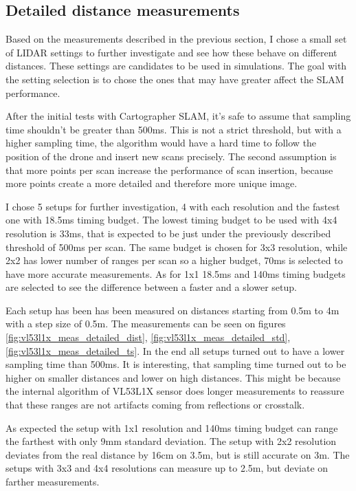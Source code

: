 \subsection{Detailed distance measurements} \label{sect:vl53l1x_detailed_measurements}
Based on the measurements described in the previous section, I chose a small set of LIDAR settings 
to further investigate and see how these behave on different distances. These settings are 
candidates to be used in simulations. The goal with the setting selection is to chose the ones
that may have greater affect the SLAM performance.

After the initial tests with Cartographer SLAM, it's safe to assume that sampling time shouldn't be
greater than 500ms. This is not a strict threshold, but with a higher sampling time, the algorithm 
would have a hard time to follow the position of the drone and insert new scans precisely. The second
assumption is that more points per scan increase the performance of scan insertion, because more points
create a more detailed and therefore more unique image. 

I chose 5 setups for further investigation, 4 with each resolution and the fastest one with 18.5ms 
timing budget. The lowest timing budget to be used with 4x4 resolution is 33ms, that is expected to be
just under the previously described threshold of 500ms per scan. The same budget is chosen for 3x3 
resolution, while 2x2 has lower number of ranges per scan so a higher budget, 70ms is selected to 
have more accurate measurements. As for 1x1 18.5ms and 140ms timing budgets are selected to see
the difference between a faster and a slower setup.

Each setup has been has been measured on distances starting from 0.5m to 4m with a step size
of 0.5m. The measurements can be seen on figures \ref{fig:vl53l1x_meas_detailed_dist},
\ref{fig:vl53l1x_meas_detailed_std}, \ref{fig:vl53l1x_meas_detailed_ts}. In the end
all setups turned out to have a lower sampling time than 500ms. It is interesting, that
sampling time turned out to be higher on smaller distances and lower on high distances.
This might be because the internal algorithm of VL53L1X sensor does longer measurements
to reassure that these ranges are not artifacts coming from reflections or crosstalk.

As expected the setup with 1x1 resolution and 140ms timing budget can range the farthest 
with only 9mm standard deviation. The setup with 2x2 resolution deviates from the real 
distance by 16cm on 3.5m, but is still accurate on 3m. 
The setups with 3x3 and 4x4 resolutions can measure up to 2.5m, but deviate on farther 
measurements. 

